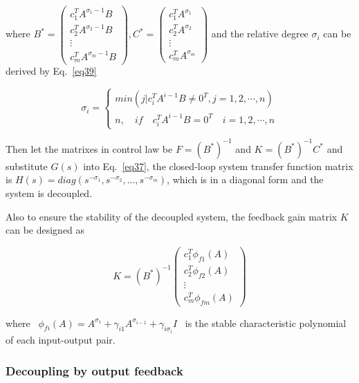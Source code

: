\documentclass[hyperref]{article}
\theoremstyle{nonumberplain}
\begin{document}
	where $B^{*}=\begin{pmatrix}
	c_{1}^{T}A^{\sigma _{1}-1}B\\ 
	c_{2}^{T}A^{\sigma _{2}-1}B\\ 
	\vdots \\ 
	c_{m}^{T}A^{\sigma _{m}-1}B
	\end{pmatrix},
	C^{*}=\begin{pmatrix}
	c_{1}^{T}A^{\sigma _{1}}\\ 
	c_{2}^{T}A^{\sigma _{2}}\\ 
	\vdots \\ 
	c_{m}^{T}A^{\sigma _{m}}
	\end{pmatrix}$ and the relative degree $\sigma_{i}$ can be derived by Eq.~\ref{eq39} 
	
	\begin{equation}
	\sigma _{i}=\left\{\begin{matrix}
	min(j|c_{i}^{T}A^{i-1}B\neq 0^{T}, j=1,2,\cdots ,n  )\\ 
	n,\quad if \quad c_{i}^{T}A^{i-1}B=0^{T} \quad i=1,2,\cdots ,n
	\end{matrix}\right.
	\label{eq39}
	\end{equation}
	
	Then let the matrixes in control law be $F=(B^{*})^{-1}$ and $K=(B^{*})^{-1}C^{*}$ and substitute $G(s)$ into Eq.~\ref{eq37}, the closed-loop system transfer function matrix is $H(s)=diag(s^{-\sigma_{1}}, s^{-\sigma_{2}}, ..., s^{-\sigma_{m}})$, which is in a diagonal form and the system is decoupled.
	
	Also to ensure the stability of the decoupled system, the feedback gain matrix $K$ can be designed as
	
	\begin{equation}
	K=(B^{*})^{-1}\begin{pmatrix}
	c_{1}^{T}\phi _{f1}(A)\\ 
	c_{2}^{T}\phi _{f2}(A)\\ 
	\vdots \\ 
	c_{m}^{T}\phi _{fm}(A)
	\end{pmatrix}
	\label{eq40}
	\end{equation}
	
	where \ $\phi _{fi}(A)=A^{\sigma_{1}}+\gamma _{i1}A^{\sigma_{i-1}}+\gamma _{i\sigma_{i}}I $ \ is the stable characteristic polynomial of each input-output pair.
	

	\subsubsection{Decoupling by output feedback}
	
\end{document}
